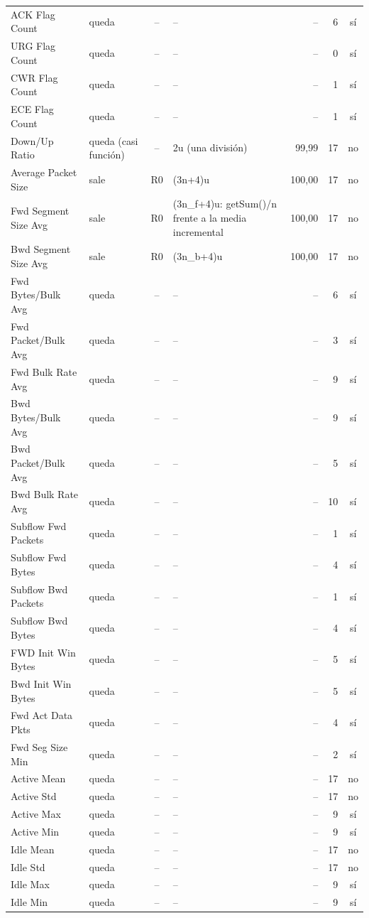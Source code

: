 \begin{longtable}{@{}>{\raggedright\arraybackslash}p{3.6cm}>{\raggedright\arraybackslash}p{2.3cm}c>{\raggedright\arraybackslash}p{3.6cm}rrc@{}}
ACK Flag Count & queda & -- & -- & -- & 6 & sí \\
URG Flag Count & queda & -- & -- & -- & 0 & sí \\
CWR Flag Count & queda & -- & -- & -- & 1 & sí \\
ECE Flag Count & queda & -- & -- & -- & 1 & sí \\
Down/Up Ratio & queda (casi función) & -- & 2u (una división) & 99{,}99 & 17 & no \\
Average Packet Size & sale & R0 & (3n+4)u & 100{,}00 & 17 & no \\
Fwd Segment Size Avg & sale & R0 & (3n\_f+4)u: getSum()/n frente a la media incremental & 100{,}00 & 17 & no \\
Bwd Segment Size Avg & sale & R0 & (3n\_b+4)u & 100{,}00 & 17 & no \\
Fwd Bytes/Bulk Avg & queda & -- & -- & -- & 6 & sí \\
Fwd Packet/Bulk Avg & queda & -- & -- & -- & 3 & sí \\
Fwd Bulk Rate Avg & queda & -- & -- & -- & 9 & sí \\
Bwd Bytes/Bulk Avg & queda & -- & -- & -- & 9 & sí \\
Bwd Packet/Bulk Avg & queda & -- & -- & -- & 5 & sí \\
Bwd Bulk Rate Avg & queda & -- & -- & -- & 10 & sí \\
Subflow Fwd Packets & queda & -- & -- & -- & 1 & sí \\
Subflow Fwd Bytes & queda & -- & -- & -- & 4 & sí \\
Subflow Bwd Packets & queda & -- & -- & -- & 1 & sí \\
Subflow Bwd Bytes & queda & -- & -- & -- & 4 & sí \\
FWD Init Win Bytes & queda & -- & -- & -- & 5 & sí \\
Bwd Init Win Bytes & queda & -- & -- & -- & 5 & sí \\
Fwd Act Data Pkts & queda & -- & -- & -- & 4 & sí \\
Fwd Seg Size Min & queda & -- & -- & -- & 2 & sí \\
Active Mean & queda & -- & -- & -- & 17 & no \\
Active Std & queda & -- & -- & -- & 17 & no \\
Active Max & queda & -- & -- & -- & 9 & sí \\
Active Min & queda & -- & -- & -- & 9 & sí \\
Idle Mean & queda & -- & -- & -- & 17 & no \\
Idle Std & queda & -- & -- & -- & 17 & no \\
Idle Max & queda & -- & -- & -- & 9 & sí \\
Idle Min & queda & -- & -- & -- & 9 & sí \\
\bottomrule
\end{longtable}
